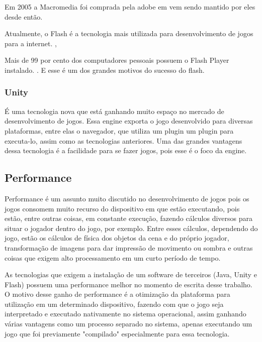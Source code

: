 Em 2005 a Macromedia foi comprada pela adobe em vem sendo mantido por
eles desde então.

Atualmente, o Flash é a tecnologia mais utilizada para desenvolvimento de jogos para a
internet. \cite{adobeflashleading},

Mais de 99 por cento dos computadores pessoais possuem o Flash Player
instalado. \cite{adobeflashpenetration}. E esse é um dos grandes
motivos do sucesso do flash.

\subsubsection{Unity}

É uma tecnologia nova que está ganhando muito espaço no mercado de
desenvolvimento de jogos. Essa engine exporta o jogo desenvolvido para
diversas plataformas, entre elas o navegador, que utiliza um plugin um
plugin para executa-lo, assim como as tecnologias anteriores.
Uma das grandes vantagens dessa tecnologia é a facilidade para se
fazer jogos, pois esse é o foco da engine.


\subsection{Performance}

Performance é um assunto muito discutido no desenvolvimento de jogos
pois os jogos consomem muito recurso do dispositivo em que estão
executando, pois estão, entre outras coisas, em constante execução, fazendo
cálculos diversos para situar o jogador dentro do jogo, por exemplo.
Entre esses cálculos, dependendo do jogo, estão os cálculos de física dos
objetos da cena e do próprio jogador, transformação de imagens para
dar impressão de movimento ou sombra e outras coisas que exigem alto
processamento em um curto período de tempo.

As tecnologias que exigem a instalação de um software de terceiros
(Java, Unity e Flash) possuem uma performance melhor no
momento de escrita desse trabalho. O motivo desse ganho de performance
é a otimização da plataforma para utilização em um determinado
dispositivo, fazendo com que o jogo seja interpretado e executado
nativamente no sistema operacional, assim ganhando várias
vantagens como um processo separado no sistema, apenas executando um
jogo que foi previamente "compilado" especialmente para essa tecnologia.

